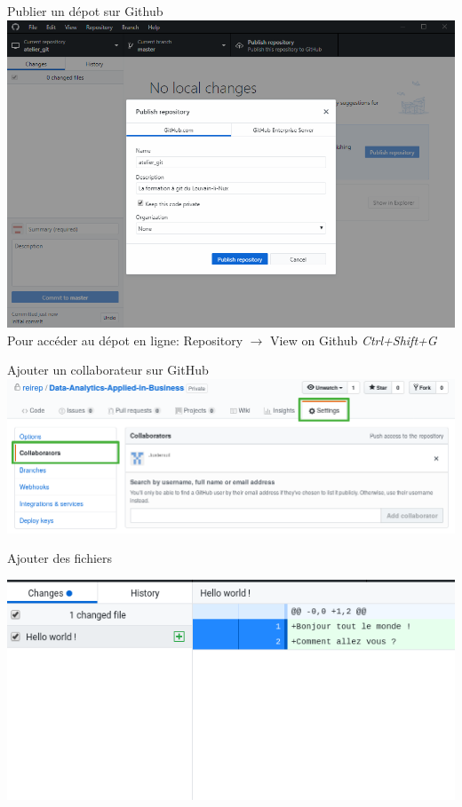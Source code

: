 \documentclass{beamer}
\begin{document}
\begin{frame}{Publier un dépot sur Github}
    \includegraphics[width=.9\textwidth]{img/publish_repo.png}
    \\
    {\small Pour accéder au dépot en ligne: Repository $\rightarrow$ View on Github \emph{Ctrl+Shift+G}}
\end{frame}

\begin{frame}{Ajouter un collaborateur sur GitHub}
    \includegraphics[width=\textwidth]{img/github_desktop/colaborator.png}
\end{frame}

\begin{frame}{Ajouter des fichiers}
    \begin{center}
        \includegraphics[width=\textwidth]{img/github_desktop/see_added.png}
    \end{center}
\end{frame}
\end{document}
